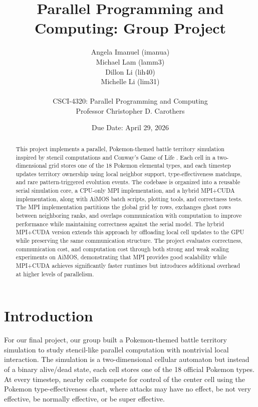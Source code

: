 \documentclass[10pt,twocolumn]{article}
\begin{document}
\title{\textbf{Parallel Programming and Computing: Group Project}}

\author{
Angela Imanuel (imanua) \\
Michael Lam (lamm3) \\
Dillon Li (lih40) \\
Michelle Li (lim31) \\
\\
CSCI-4320: Parallel Programming and Computing \\
Professor Christopher D. Carothers
}

\date{Due Date: April 29, 2026}

\maketitle

\begin{abstract}
This project implements a parallel, Pokemon-themed battle territory simulation inspired by stencil computations and Conway's Game of Life \cite{gameoflife, stencil}. Each cell in a two-dimensional grid stores one of the 18 Pokemon elemental types, and each timestep updates territory ownership using local neighbor support, type-effectiveness matchups, and rare pattern-triggered evolution events. The codebase is organized into a reusable serial simulation core, a CPU-only MPI implementation, and a hybrid MPI+CUDA implementation, along with AiMOS batch scripts, plotting tools, and correctness tests. The MPI implementation partitions the global grid by rows, exchanges ghost rows between neighboring ranks, and overlaps communication with computation to improve performance while maintaining correctness against the serial model. The hybrid MPI+CUDA version extends this approach by offloading local cell updates to the GPU while preserving the same communication structure. The project evaluates correctness, communication cost, and computation cost through both strong and weak scaling experiments on AiMOS, demonstrating that MPI provides good scalability while MPI+CUDA achieves significantly faster runtimes but introduces additional overhead at higher levels of parallelism.
\end{abstract}

\section*{Introduction}

For our final project, our group built a Pokemon-themed battle territory simulation to study stencil-like parallel computation with nontrivial local interaction. The simulation is a two-dimensional cellular automaton \cite{golbook} but instead of a binary alive/dead state, each cell stores one of the 18 official Pokemon types. At every timestep, nearby cells compete for control of the center cell using the Pokemon type-effectiveness chart, where attacks may have no effect, be not very effective, be normally effective, or be super effective.
\end{document}
